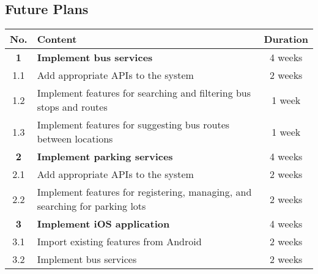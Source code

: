     
\subsection{Future Plans}

\begin{table}[H]
    \centering
    \begin{tabularx}{\textwidth}{| c | X | c |}
        \hline
        No.     &       \centering Content                                                              &   Duration    \\ \hline
        \textbf{1}       &       \centering \textbf{Implement bus services}                             &   4 weeks     \\ \hline
        1.1     &       Add appropriate APIs to the system                                              &   2 weeks     \\ \hline
        1.2     &       Implement features for searching and filtering bus stops and routes             &   1 week      \\ \hline
        1.3     &       Implement features for suggesting bus routes between locations                  &   1 week      \\ \hline
        \textbf{2}       &       \centering \textbf{Implement parking services}                         &   4 weeks     \\ \hline
        2.1     &       Add appropriate APIs to the system                                              &   2 weeks     \\ \hline
        2.2     &       Implement features for registering, managing, and searching for parking lots    &   2 weeks     \\ \hline
        \textbf{3}       &       \centering \textbf{Implement iOS application}                          &   4 weeks     \\ \hline
        3.1     &       Import existing features from Android                                           &   2 weeks     \\ \hline
        3.2     &       Implement bus services                                                          &   2 weeks     \\ \hline
    \end{tabularx}
\end{table}